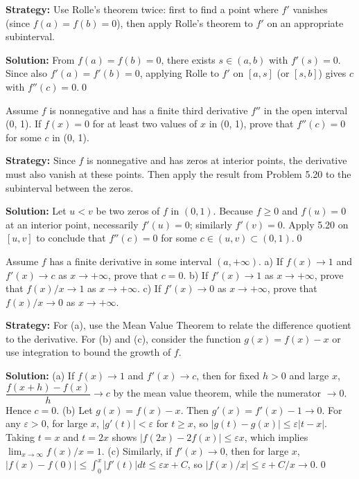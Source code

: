 \noindent\textbf{Strategy:} Use Rolle's theorem twice: first to find a point where \( f' \) vanishes (since \( f(a) = f(b) = 0 \)), then apply Rolle's theorem to \( f' \) on an appropriate subinterval.

\bigskip\noindent\textbf{Solution:}
From $f(a)=f(b)=0$, there exists $s\in(a,b)$ with $f'(s)=0$. Since also $f'(a)=f'(b)=0$, applying Rolle to $f'$ on $[a,s]$ (or $[s,b]$) gives $c$ with $f''(c)=0$.\qed


\begin{problembox}
Assume \( f \) is nonnegative and has a finite third derivative \( f'' \) in the open interval (0, 1). If \( f(x) = 0 \) for at least two values of \( x \) in (0, 1), prove that \( f''(c) = 0 \) for some \( c \) in (0, 1).
\end{problembox}

\noindent\textbf{Strategy:} Since \( f \) is nonnegative and has zeros at interior points, the derivative must also vanish at these points. Then apply the result from Problem 5.20 to the subinterval between the zeros.

\bigskip\noindent\textbf{Solution:}
Let $u<v$ be two zeros of $f$ in $(0,1)$. Because $f\ge 0$ and $f(u)=0$ at an interior point, necessarily $f'(u)=0$; similarly $f'(v)=0$. Apply 5.20 on $[u,v]$ to conclude that $f''(c)=0$ for some $c\in(u,v)\subset(0,1)$.\qed


\begin{problembox}
Assume \( f \) has a finite derivative in some interval \( (a, +\infty) \).
a) If \( f(x) \to 1 \) and \( f'(x) \to c \) as \( x \to +\infty \), prove that \( c = 0 \).
b) If \( f'(x) \to 1 \) as \( x \to +\infty \), prove that \( f(x)/x \to 1 \) as \( x \to +\infty \).
c) If \( f'(x) \to 0 \) as \( x \to +\infty \), prove that \( f(x)/x \to 0 \) as \( x \to +\infty \).
\end{problembox}

\noindent\textbf{Strategy:} For (a), use the Mean Value Theorem to relate the difference quotient to the derivative. For (b) and (c), consider the function \( g(x) = f(x) - x \) or use integration to bound the growth of \( f \).

\bigskip\noindent\textbf{Solution:}
(a) If $f(x)\to 1$ and $f'(x)\to c$, then for fixed $h>0$ and large $x$, $\dfrac{f(x+h)-f(x)}{h}\to c$ by the mean value theorem, while the numerator $\to 0$. Hence $c=0$. (b) Let $g(x)=f(x)-x$. Then $g'(x)=f'(x)-1\to 0$. For any $\varepsilon>0$, for large $x$, $|g'(t)|<\varepsilon$ for $t\ge x$, so $|g(t)-g(x)|\le \varepsilon|t-x|$. Taking $t=x$ and $t=2x$ shows $|f(2x)-2f(x)|\le \varepsilon x$, which implies $\lim_{x\to\infty}f(x)/x=1$. (c) Similarly, if $f'(x)\to 0$, then for large $x$, $|f(x)-f(0)|\le \int_0^x|f'(t)|dt\le \varepsilon x+C$, so $|f(x)/x|\le \varepsilon+C/x\to 0$.\qed


